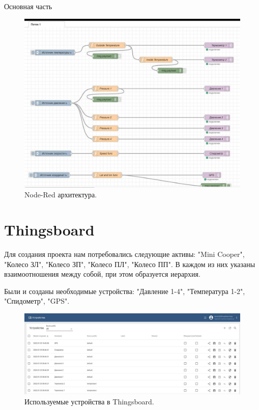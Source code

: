 \begin{chapter}{Основная часть}
    \begin{figure}[!ht]
		\centering
		\includegraphics[scale=0.4]{pictures/8.jpg}
		\caption{Node-Red архитектура.}
		\label{fig1}
	\end{figure}
	

\section{Thingsboard}

    Для создания проекта нам потребовались следующие активы: "Mini Cooper", "Колесо ЗЛ", "Колесо ЗП", "Колесо ПЛ", "Колесо ПП". В каждом из них указаны взаимоотношения между собой, при этом образуется иерархия.
    
    Были и созданы необходимые устройства: "Давление 1-4", "Температура 1-2", "Спидометр", "GPS".
    
    \begin{figure}[!ht]
		\centering
		\includegraphics[scale=0.4]{pictures/4.jpg}
		\caption{Используемые устройства в Thingsboard.}
		\label{fig1}
	\end{figure}


\end{chapter}
